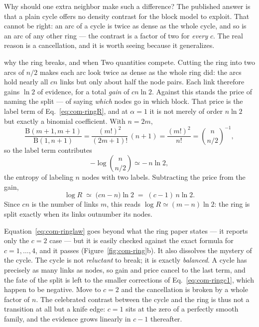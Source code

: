 Why should one extra neighbor make such a difference? The published answer is that
a plain cycle offers no density contrast for the block model to exploit. That
cannot be right: an arc of a cycle is twice as dense as the whole cycle, and so is
an arc of any other ring --- the contrast is a factor of two for \emph{every} $c$.
The real reason is a cancellation, and it is worth seeing because it generalizes.

\begin{calculation}{why the ring breaks, and when}
Two quantities compete. Cutting the ring into two arcs of $n/2$ makes each arc
look twice as dense as the whole ring did: the arcs hold nearly all $cn$ links but
only about half the node pairs. Each link therefore gains $\ln 2$ of evidence, for
a total \emph{gain} of $cn\ln 2$. Against this stands the price of naming the
split --- of saying \emph{which} nodes go in which block. That price is the label
term of Eq.~\eqref{eq:com-ringR}, and at $\alpha=1$ it is not merely of order
$n\ln 2$ but exactly a binomial coefficient. With $n=2m$,
\begin{equation}
  \frac{\mathrm{B}(m{+}1,m{+}1)}{\mathrm{B}(1,n{+}1)}
  = \frac{(m!)^{2}}{(2m{+}1)!}\,(n{+}1)
  = \frac{(m!)^{2}}{n!}
  = \binom{n}{n/2}^{-1},
  \label{eq:com-labelexact}
\end{equation}
so the label term contributes
\begin{equation}
  -\log\binom{n}{n/2} \simeq -\,n\ln 2,
  \label{eq:com-label}
\end{equation}
the entropy of labeling $n$ nodes with two labels. Subtracting the price from the
gain,
\begin{equation}
  \log R \;\simeq\; \big(cn - n\big)\ln 2 \;=\; (c-1)\,n\ln 2 .
  \label{eq:com-ringlaw}
\end{equation}
Since $cn$ is the number of links $m$, this reads
$\log R\simeq(m-n)\ln 2$: the ring is split exactly when its links
outnumber its nodes.
\end{calculation}

Equation~\eqref{eq:com-ringlaw} goes beyond what the ring paper states --- it
reports only the $c=2$ case --- but it is easily checked against the exact formula
for $c=1,\dots,4$, and it passes (Figure~\ref{fig:com-ring}b). It also dissolves
the mystery of the cycle. The cycle is not \emph{reluctant} to break; it is
exactly \emph{balanced}. A cycle has precisely as many links as nodes, so gain and
price cancel to the last term, and the fate of the split is left to the smaller
corrections of Eq.~\eqref{eq:com-ringc1}, which happen to be negative. Move to
$c=2$ and the cancellation is broken by a whole factor of $n$. The celebrated
contrast between the cycle and the ring is thus not a transition at all but a
knife edge: $c=1$ sits at the zero of a perfectly smooth family, and the evidence
grows linearly in $c-1$ thereafter.

